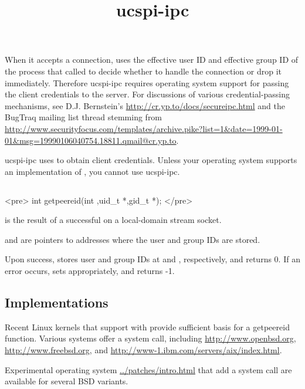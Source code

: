 \documentclass{book}
\title{ucspi-ipc}
\begin{document}
\section{}

When it accepts a connection,  uses the effective user
ID and effective group ID of the process that called  to
decide whether to handle the connection or drop it immediately.
Therefore ucspi-ipc requires operating system support for passing the
client credentials to the server.  For discussions of various
credential-passing mechanisms, see D.J. Bernstein's
\href{Secure interprocess communication}{http://cr.yp.to/docs/secureipc.html}
and the BugTraq mailing list thread stemming from
\href{Wiping out setuid programs}{http://www.securityfocus.com/templates/archive.pike?list=1&date=1999-01-01&msg=19990106040754.18811.qmail@cr.yp.to}.

ucspi-ipc uses  to obtain client credentials.  Unless
your operating system supports an implementation of ,
you cannot use ucspi-ipc.

\subsection{}
<pre>
  int getpeereid(int ,uid_t *,gid_t *);
</pre>

 is the result of a successful  on a local-domain
stream socket.

 and  are pointers to addresses where the user and group
IDs are stored.

Upon success,  stores user and group IDs at 
and , respectively, and returns 0.  If an error occurs,
 sets  appropriately, and returns -1.


\subsection{Implementations}
Recent Linux kernels that support  with
 provide sufficient basis for a getpeereid function.
Various systems offer a  system call, including
\href{OpenBSD~3.0}{http://www.openbsd.org},
\href{FreeBSD~4.6}{http://www.freebsd.org}, and
\href{AIX~5L}{http://www-1.ibm.com/servers/aix/index.html}.

Experimental operating system \href{patches}{../patches/intro.html}
that add a  system call are available for several BSD
variants.
\end{document}
